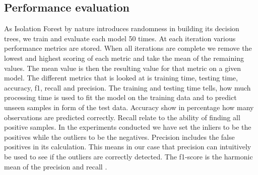 \subsection{Performance evaluation}
As Isolation Forest by nature introduces randomness in building its decision trees, we train and evaluate each model 50 times. At each iteration various performance metrics are stored. When all iterations are complete we remove the lowest and highest scoring of each metric and take the mean of the remaining values. The mean value is then the resulting value for that metric on a given model. The different metrics that is looked at is training time, testing time, accuracy, f1, recall and precision. The training and testing time tells, how much processing time is used to fit the model on the training data and to predict unseen samples in form of the test data. Accuracy show in percentage how many observations are predicted correctly. Recall relate to the ability of finding all positive samples. In the experiments conducted we have set the inliers to be the positives while the outliers to be the negatives. Precision includes the false positives in its calculation. This means in our case that precision can intuitively be used to see if the outliers are correctly detected. The f1-score is the harmonic mean of the precision and recall \cite{sklearn}.



